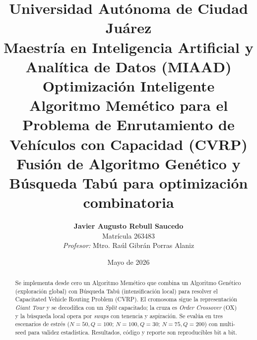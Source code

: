 \documentclass[12pt,a4paper]{article}
\title{
    \vspace{-2cm}
    \large Universidad Autónoma de Ciudad Juárez \\
    \large Maestría en Inteligencia Artificial y Analítica de Datos (MIAAD) \\
    \large Optimización Inteligente \\
    \vspace{1cm}
    \Huge \textbf{Algoritmo Memético para el Problema de Enrutamiento de Vehículos con Capacidad (CVRP)} \\
    \vspace{0.5cm}
    \large Fusión de Algoritmo Genético y Búsqueda Tabú para optimización combinatoria
}
\author{
    \textbf{Javier Augusto Rebull Saucedo} \\
    Matrícula 263483 \\
    \vspace{0.3cm}
    \textit{Profesor:} Mtro. Raúl Gibrán Porras Alaniz
}
\date{Mayo de 2026}
\begin{document}
\maketitle
\thispagestyle{empty}

\begin{abstract}
Se implementa desde cero un Algoritmo Memético que combina un Algoritmo Genético (exploración global) con Búsqueda Tabú (intensificación local) para resolver el Capacitated Vehicle Routing Problem (CVRP). El cromosoma sigue la representación \emph{Giant Tour} y se decodifica con un \emph{Split} capacitado; la cruza es \emph{Order Crossover} (OX) y la búsqueda local opera por \emph{swaps} con tenencia y aspiración. Se evalúa en tres escenarios de estrés ($N{=}50,Q{=}100$; $N{=}100,Q{=}30$; $N{=}75,Q{=}200$) con multi-seed para validez estadística. Resultados, código y reporte son reproducibles bit a bit.
\end{abstract}

\newpage
\tableofcontents
\newpage









\printbibliography[heading=bibintoc, title={Referencias}]
\end{document}

